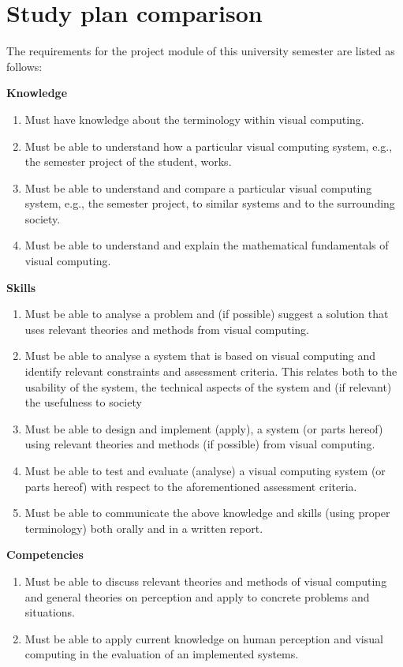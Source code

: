 \chapter{Study plan comparison}\label{app:semesterRequirements}
The requirements for the project module of this university semester are listed as follows:

\textbf{Knowledge}
\begin{enumerate}
\item Must have knowledge about the terminology within visual computing.
\item Must be able to understand how a particular visual computing system, e.g., the semester project of the student, works.
\item Must be able to understand and compare a particular visual computing system, e.g., the semester project, to similar systems and to the surrounding society.
\item Must be able to understand and explain the mathematical fundamentals of visual computing.
\setcounter{enumTemp}{\theenumi}
\end{enumerate}

\textbf{Skills}
\begin{enumerate}
\setcounter{enumi}{\theenumTemp}
\item Must be able to analyse a problem and (if possible) suggest a solution that uses relevant theories and methods from visual computing.
\item Must be able to analyse a system that is based on visual computing and identify relevant constraints and assessment criteria. This relates both to the usability of the system, the technical aspects of the system and (if relevant) the usefulness to society 
\item Must be able to design and implement (apply), a system (or parts hereof) using relevant theories and methods (if possible) from visual computing.
\item Must be able to test and evaluate (analyse) a visual computing system (or parts hereof) with respect to the aforementioned assessment criteria.
\item Must be able to communicate the above knowledge and skills (using proper terminology) both orally and in a written report.
\setcounter{enumTemp}{\theenumi}
\end{enumerate}

\textbf{Competencies}
\begin{enumerate}
\setcounter{enumi}{\theenumTemp}
\item Must be able to discuss relevant theories and methods of visual computing and general theories on perception and apply to concrete problems and situations.
\item Must be able to apply current knowledge on human perception and visual computing in the evaluation of an implemented systems.
\end{enumerate}
\par

